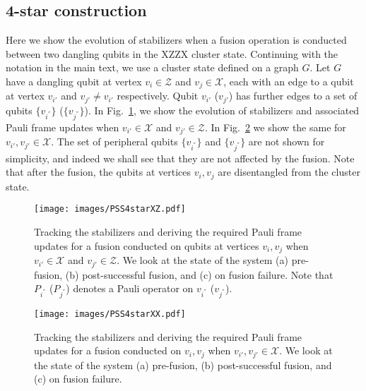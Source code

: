 \documentclass[reprint,
groupedaddress,
 prl,amsmath,amssymb,
 aps]{revtex4-2}
\theoremstyle{definition}
\begin{document}
\begin{bibunit}
\section{4-star construction} 
Here we show the evolution of stabilizers when a fusion operation is conducted between two dangling qubits in the XZZX cluster state. 
Continuing with the notation in the main text, we use a cluster state defined on a graph $G$. Let $G$ have a  dangling qubit at vertex $v_i \in \mathcal{Z}$ and $v_j \in \mathcal{X}$, each with an edge to a qubit at vertex $v_{i'}$ and $v_{j'}\neq v_{i'}$ respectively. Qubit $v_{i'}$ ($v_{j'}$) has further edges to a set of qubits $\{v_{i^{''}}\}$ ($\{v_{j^{''}}\}$). In Fig.~\ref{fig:4starstabilizercheckXZ}, we show the evolution of stabilizers and associated Pauli frame updates when  $v_{i'}\in\mathcal{X}$ and $v_{j'}\in\mathcal{Z}$. In Fig.~\ref{fig:4starstabilizercheckXX} we show the same for  $v_{i'},v_{j'}\in\mathcal{X}$. The set of peripheral qubits $\{v_{i^{''}}\}$ 
 and $\{v_{j^{''}}\}$  are not shown for simplicity, and indeed we shall see that they are not affected by the fusion. Note that after the fusion, the qubits at vertices $v_i, v_j$ are disentangled from the cluster state.
\begin{figure}[ht]
    \centering    \texttt{[image: images/PSS4starXZ.pdf]}
    \caption{Tracking the stabilizers and deriving the required Pauli frame updates for a fusion conducted on qubits at vertices $v_i,v_j$ when $v_{i'}\in\mathcal{X}$ and $v_{j'}\in\mathcal{Z}$. We look at the state of the system (a) pre-fusion, (b) post-successful fusion, and (c) on fusion failure. Note that $P_{i^{''}}$ ($P_{j^{''}}$) denotes a Pauli operator on $v_{i^{''}}$ ($v_{j^{''}}$).}
\label{fig:4starstabilizercheckXZ}
\end{figure}
\begin{figure}[ht]
    \centering    \texttt{[image: images/PSS4starXX.pdf]}
    \caption{Tracking the stabilizers and deriving the required Pauli frame updates for a fusion conducted on $v_i,v_j$ when $v_{i'},v_{j'}\in\mathcal{X}$. We look at the state of the system (a) pre-fusion, (b) post-successful fusion, and (c) on fusion failure. }
\label{fig:4starstabilizercheckXX}
\end{figure}\\

\end{bibunit}
\end{document}
